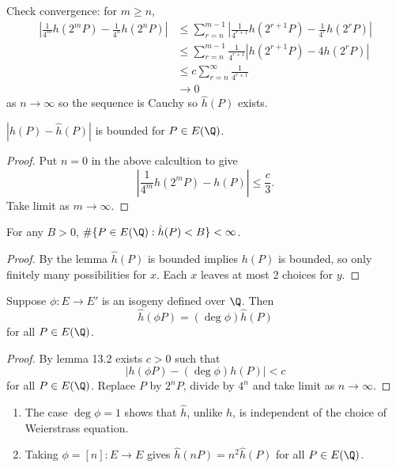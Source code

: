 \documentclass[a4paper]{article}
\theoremstyle{definition}
\begin{document}
Check convergence: for \(m \geq n\),
\begin{align*}
  |\frac{1}{4^m} h(2^m P) - \frac{1}{4^n} h(2^n P)|
  &\leq \sum_{r = n}^{m - 1} |\frac{1}{4^{r + 1}} h(2^{r + 1}P) - \frac{1}{4^r} h(2^r P)| \\
  &\leq \sum_{r = n}^{m - 1} \frac{1}{4^{r + 1}} |h(2^{r + 1}P) - 4h(2^r P)| \\
  &\leq c \sum_{r = n}^\infty \frac{1}{4^{r + 1}} \\
  &\to 0
\end{align*}
as \(n \to \infty\) so the sequence is Cauchy so \(\hat h(P)\) exists.

\begin{lemma}
  \(|h(P) - \hat h(P)|\) is bounded for \(P \in E(\Q)\).
\end{lemma}

\begin{proof}
  Put \(n = 0\) in the above calcultion to give
  \[
    |\frac{1}{4^m} h(2^m P) - h(P)| \leq \frac{c}{3}.
  \]
  Take limit as \(m \to \infty\).
\end{proof}

\begin{corollary}
  For any \(B > 0\), \(\# \{P \in E(\Q): \hat h(P) < B\} < \infty\).
\end{corollary}

\begin{proof}
  By the lemma \(\hat h(P)\) is bounded implies \(h(P)\) is bounded, so only finitely many possibilities for \(x\). Each \(x\) leaves at most 2 choices for \(y\).
\end{proof}

\begin{lemma}
  Suppose \(\phi: E \to E'\) is an isogeny defined over \(\Q\). Then
  \[
    \hat h(\phi P) = (\deg \phi) \hat h(P)
  \]
  for all \(P \in E(\Q)\).
\end{lemma}

\begin{proof}
  By lemma 13.2 exists \(c > 0\) such that
  \[
    |h(\phi P) - (\deg \phi) h(P)| < c
  \]
  for all \(P \in E(\Q)\). Replace \(P\) by \(2^nP\), divide by \(4^n\) and take limit as \(n \to \infty\).
\end{proof}

\begin{remark}\leavevmode
  \begin{enumerate}
  \item The case \(\deg \phi = 1\) shows that \(\hat h\), unlike \(h\), is independent of the choice of Weierstrass equation.
  \item Taking \(\phi = [n]: E \to E\) gives \(\hat h(nP) = n^2 \hat h(P)\) for all \(P \in E(\Q)\).
  \end{enumerate}
\end{remark}
\end{document}
